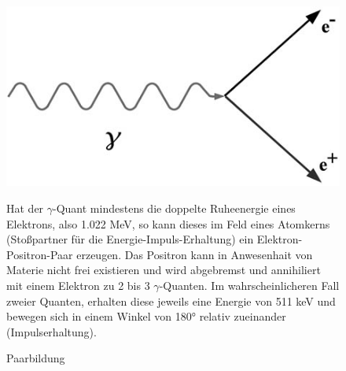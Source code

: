 \begin{figure}[H]
	\begin{minipage}{0.5\textwidth}
	\centering \includegraphics[width=\textwidth]{Bilder/Paarbildung.jpg}
	\caption{Paarbildung}
	\end{minipage}
	\begin{minipage}{0.5\textwidth}
	Hat der $\gamma$-Quant mindestens die doppelte Ruheenergie eines Elektrons, also 1.022 MeV, so kann dieses im Feld eines Atomkerns (Stoßpartner für die Energie-Impuls-Erhaltung) ein Elektron-Positron-Paar erzeugen. Das Positron kann in Anwesenhait von Materie nicht frei existieren und wird abgebremst und annihiliert mit einem Elektron zu 2 bis 3 $\gamma$-Quanten. Im wahrscheinlicheren Fall zweier Quanten, erhalten diese jeweils eine Energie von 511 keV und bewegen sich in einem Winkel von 180° relativ zueinander (Impulserhaltung).
	\end{minipage}
\end{figure}































